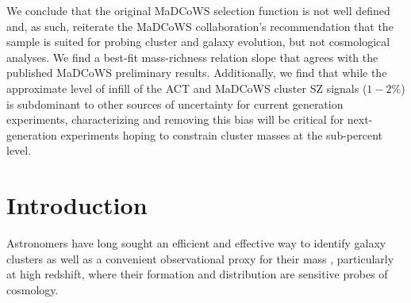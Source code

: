 \documentclass[longauth]{aa} %
\begin{document}
    {We conclude that the original MaDCoWS selection function is not well defined and, as such,  reiterate the MaDCoWS collaboration’s recommendation that the sample is suited for probing cluster and galaxy evolution, but not cosmological analyses. We find a best-fit mass-richness relation slope that agrees with the published MaDCoWS preliminary results. Additionally, we find that while the approximate level of infill of the ACT and MaDCoWS cluster SZ signals ($1-2\%$) is subdominant to other sources of uncertainty for current generation experiments, characterizing and removing this bias will be critical for next-generation experiments hoping to constrain cluster masses at the sub-percent level. %
    }

   \maketitle
%


\section{Introduction}\label{sec:intro}

Astronomers have long sought an efficient and effective way to identify galaxy clusters as well as a convenient observational proxy for their mass  \citep{Abell1958,Rykoff2012,Andreon2015,Saro2015,Geach2017,Simet2017,Rettura2018,Gonzalez2019,Chiu2020}, particularly at high redshift, where their formation and distribution are sensitive probes of cosmology.
\end{document}
